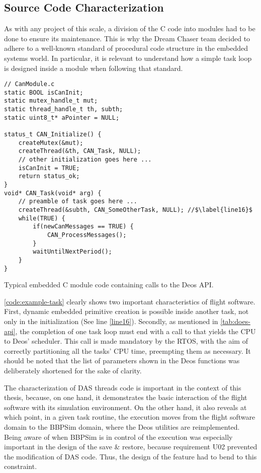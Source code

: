 {\subsection*{Source Code Characterization}
As with any project of this scale, a division of the C code into modules had to be done to ensure its maintenance. This is why the Dream Chaser team decided to adhere to a well-known standard of procedural code structure in the embedded systems world. In particular, it is relevant to understand how a simple task loop is designed inside a module when following that standard. 
\begin{listing}[H]
	\begin{verbatim}
// CanModule.c
static BOOL isCanInit;
static mutex_handle_t mut;
static thread_handle_t th, subth;
static uint8_t* aPointer = NULL;

status_t CAN_Initialize() {
	createMutex(&mut);
	createThread(&th, CAN_Task, NULL);
	// other initialization goes here ...
	isCanInit = TRUE;
	return status_ok;
}
void* CAN_Task(void* arg) {
	// preamble of task goes here ...
	createThread(&subth, CAN_SomeOtherTask, NULL); //$\label{line16}$
	while(TRUE) {
		if(newCanMessages == TRUE) {
			CAN_ProcessMessages();
		}
		waitUntilNextPeriod();
	}
}
	\end{verbatim}
	\caption{Typical embedded C module code containing calls to the Deos API.}
	\label{code:example-task}
\end{listing}

\autoref{code:example-task} clearly shows two important characteristics of flight software. First, dynamic embedded primitive creation is possible inside another task, not only in the initialization (See line \ref{line16}). Secondly, as mentioned in \autoref{tab:does-api}, the completion of one task loop must end with a call to  that yields the CPU to Deos' scheduler. This call is made mandatory by the RTOS, with the aim of correctly partitioning all the tasks' CPU time, preempting them as necessary. It should be noted that the list of parameters shown in the Deos functions was deliberately shortened for the sake of clarity. 

The characterization of DAS threads code is important in the context of this thesis, because, on one hand, it demonstrates the basic interaction of the flight software with its simulation environment. On the other hand, it also reveals at which point, in a given task routine, the execution moves from the flight software domain to the BBPSim domain, where the Deos utilities are reimplemented. Being aware of when BBPSim is in control of the execution was especially important in the design of the save \& restore, because requirement U02 prevented the modification of DAS code. Thus, the design of the feature had to bend to this constraint.
}